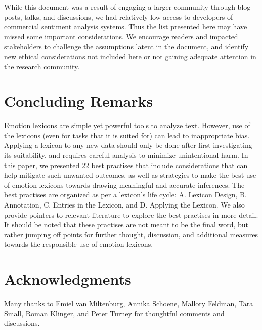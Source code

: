 \documentclass[11pt]{article}
\begin{document}
While this document was a result of engaging a larger community through blog posts, talks, and discussions, we had relatively low access to developers of commercial sentiment analysis systems.
Thus the list presented here may have missed some important considerations.
We encourage readers and impacted stakeholders to challenge the assumptions latent in the document, and identify new ethical considerations not included here or not gaining adequate attention in the research community. 


\section{Concluding Remarks}
\noindent Emotion lexicons are simple yet powerful tools to analyze text. However, use of the lexicons (even for tasks that it is suited for) can lead to inappropriate bias. Applying a lexicon to any new data should only be done after first investigating its suitability, and requires careful analysis to minimize unintentional harm. 
In this paper, we presented 22 best practises that include considerations that can help mitigate such unwanted outcomes, as well as strategies to make the best use of emotion lexicons towards drawing meaningful and accurate inferences.
The best practises are organized as per a lexicon's life cycle:
A. Lexicon Design, B. Annotation, C. Entries in the Lexicon, and D. Applying the Lexicon. 
We also provide pointers to relevant literature to explore the best practises in more detail.
It should be noted that these practises are not meant to be the final word, but rather jumping off points for further thought, discussion, and additional measures towards the responsible use of emotion lexicons.


\section*{Acknowledgments}
 Many thanks to Emiel van Miltenburg, Annika Schoene, Mallory Feldman, Tara Small, Roman Klinger,  and Peter Turney for thoughtful comments and discussions.
 
 
% 









\end{document}
